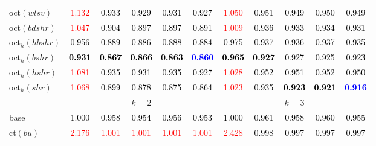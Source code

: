 \begin{tabular}[t]{l|>{}cccc>{}c|ccccc}
oct$(wlsv)$ & \textcolor{red}{1.132} & \textcolor{black}{0.933} & \textcolor{black}{0.929} & \textcolor{black}{0.931} & \textcolor{black}{0.927} & \textcolor{red}{1.050} & \textcolor{black}{0.951} & \textcolor{black}{0.949} & \textcolor{black}{0.950} & \textcolor{black}{0.949}\\
oct$(bdshr)$ & \textcolor{red}{1.047} & \textcolor{black}{0.904} & \textcolor{black}{0.897} & \textcolor{black}{0.897} & \textcolor{black}{0.891} & \textcolor{red}{1.009} & \textcolor{black}{0.936} & \textcolor{black}{0.933} & \textcolor{black}{0.934} & \textcolor{black}{0.931}\\
oct$_h(hbshr)$ & \textcolor{black}{0.956} & \textcolor{black}{0.889} & \textcolor{black}{0.886} & \textcolor{black}{0.888} & \textcolor{black}{0.884} & \textcolor{black}{0.975} & \textcolor{black}{0.937} & \textcolor{black}{0.936} & \textcolor{black}{0.937} & \textcolor{black}{0.935}\\
oct$_h(bshr)$ & \textcolor{black}{\textbf{0.931}} & \textcolor{black}{\textbf{0.867}} & \textcolor{black}{\textbf{0.866}} & \textcolor{black}{\textbf{0.863}} & \textcolor{blue}{\textbf{0.860}} & \textcolor{black}{\textbf{0.965}} & \textcolor{black}{\textbf{0.927}} & \textcolor{black}{0.927} & \textcolor{black}{0.925} & \textcolor{black}{0.923}\\
oct$_h(hshr)$ & \textcolor{red}{1.081} & \textcolor{black}{0.935} & \textcolor{black}{0.931} & \textcolor{black}{0.935} & \textcolor{black}{0.927} & \textcolor{red}{1.028} & \textcolor{black}{0.952} & \textcolor{black}{0.951} & \textcolor{black}{0.952} & \textcolor{black}{0.950}\\
oct$_h(shr)$ & \textcolor{red}{1.068} & \textcolor{black}{0.899} & \textcolor{black}{0.878} & \textcolor{black}{0.875} & \textcolor{black}{0.864} & \textcolor{red}{1.023} & \textcolor{black}{0.935} & \textcolor{black}{\textbf{0.923}} & \textcolor{black}{\textbf{0.921}} & \textcolor{blue}{\textbf{0.916}}\\
\addlinespace[0.3em]
\multicolumn{1}{c}{} & \multicolumn{5}{c}{\textbf{$k = 2$}} & \multicolumn{5}{c}{\textbf{$k = 3$}}\\
base & \textcolor{black}{1.000} & \textcolor{black}{0.958} & \textcolor{black}{0.954} & \textcolor{black}{0.956} & \textcolor{black}{0.953} & \textcolor{black}{1.000} & \textcolor{black}{0.961} & \textcolor{black}{0.958} & \textcolor{black}{0.960} & \textcolor{black}{0.955}\\
ct$(bu)$ & \textcolor{red}{2.176} & \textcolor{red}{1.001} & \textcolor{red}{1.001} & \textcolor{red}{1.001} & \textcolor{red}{1.001} & \textcolor{red}{2.428} & \textcolor{black}{0.998} & \textcolor{black}{0.997} & \textcolor{black}{0.997} & \textcolor{black}{0.997}\\

\end{tabular}

